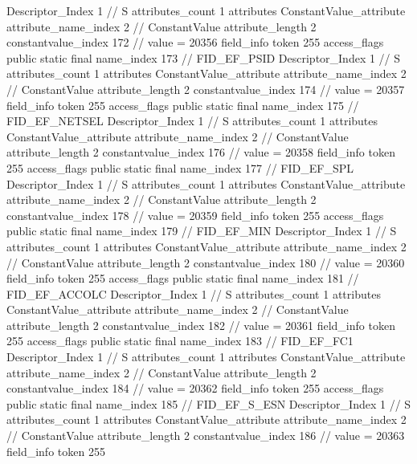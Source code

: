 {{{{{				Descriptor_Index	1		// S
				attributes_count	1
				attributes {
				ConstantValue_attribute {
					attribute_name_index	2		// ConstantValue
					attribute_length	2
					constantvalue_index	172		// value = 20356
				}
				}
			}
			field_info {
				token	255
				access_flags	public static final
				name_index	173		// FID_EF_PSID
				Descriptor_Index	1		// S
				attributes_count	1
				attributes {
				ConstantValue_attribute {
					attribute_name_index	2		// ConstantValue
					attribute_length	2
					constantvalue_index	174		// value = 20357
				}
				}
			}
			field_info {
				token	255
				access_flags	public static final
				name_index	175		// FID_EF_NETSEL
				Descriptor_Index	1		// S
				attributes_count	1
				attributes {
				ConstantValue_attribute {
					attribute_name_index	2		// ConstantValue
					attribute_length	2
					constantvalue_index	176		// value = 20358
				}
				}
			}
			field_info {
				token	255
				access_flags	public static final
				name_index	177		// FID_EF_SPL
				Descriptor_Index	1		// S
				attributes_count	1
				attributes {
				ConstantValue_attribute {
					attribute_name_index	2		// ConstantValue
					attribute_length	2
					constantvalue_index	178		// value = 20359
				}
				}
			}
			field_info {
				token	255
				access_flags	public static final
				name_index	179		// FID_EF_MIN
				Descriptor_Index	1		// S
				attributes_count	1
				attributes {
				ConstantValue_attribute {
					attribute_name_index	2		// ConstantValue
					attribute_length	2
					constantvalue_index	180		// value = 20360
				}
				}
			}
			field_info {
				token	255
				access_flags	public static final
				name_index	181		// FID_EF_ACCOLC
				Descriptor_Index	1		// S
				attributes_count	1
				attributes {
				ConstantValue_attribute {
					attribute_name_index	2		// ConstantValue
					attribute_length	2
					constantvalue_index	182		// value = 20361
				}
				}
			}
			field_info {
				token	255
				access_flags	public static final
				name_index	183		// FID_EF_FC1
				Descriptor_Index	1		// S
				attributes_count	1
				attributes {
				ConstantValue_attribute {
					attribute_name_index	2		// ConstantValue
					attribute_length	2
					constantvalue_index	184		// value = 20362
				}
				}
			}
			field_info {
				token	255
				access_flags	public static final
				name_index	185		// FID_EF_S_ESN
				Descriptor_Index	1		// S
				attributes_count	1
				attributes {
				ConstantValue_attribute {
					attribute_name_index	2		// ConstantValue
					attribute_length	2
					constantvalue_index	186		// value = 20363
				}
				}
			}
			field_info {
				token	255
}}}}}
